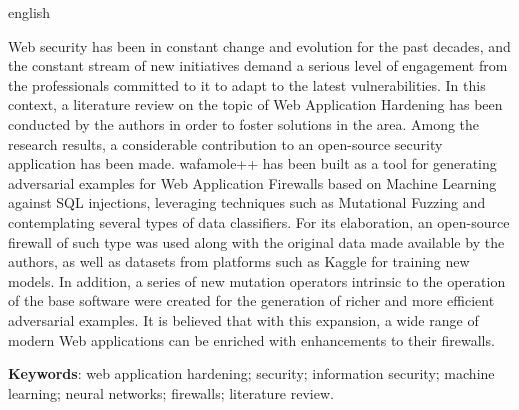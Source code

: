 \begin{resumo}[Abstract]
\begin{otherlanguage*}{english}
\begin{SingleSpace}
Web security has been in constant change and evolution for the past decades, and the constant stream of new initiatives demand a serious level of engagement from the professionals committed to it to adapt to the latest vulnerabilities. In this context, a literature review on the topic of Web Application Hardening has been conducted by the authors in order to foster solutions in the area. Among the research results, a considerable contribution to an open-source security application has been made. wafamole++ has been built as a tool for generating adversarial examples for Web Application Firewalls based on Machine Learning against SQL injections, leveraging techniques such as Mutational Fuzzing and contemplating several types of data classifiers. For its elaboration, an open-source firewall of such type was used along with the original data made available by the authors, as well as datasets from platforms such as Kaggle for training new models. In addition, a series of new mutation operators intrinsic to the operation of the base software were created for the generation of richer and more efficient adversarial examples. It is believed that with this expansion, a wide range of modern Web applications can be enriched with enhancements to their firewalls.
\end{SingleSpace}


\vspace{\onelineskip}
   \textbf{Keywords}: web application hardening; security; information security; machine learning; neural networks; firewalls; literature review.
   
 \end{otherlanguage*}
\end{resumo}




  
